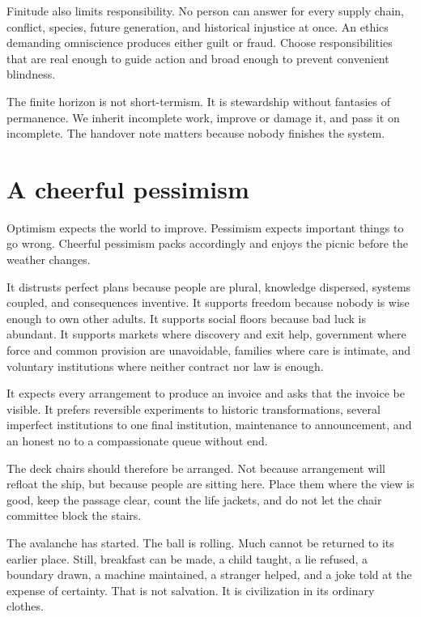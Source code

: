 \documentclass[12pt,a4paper]{book}
\begin{document}
Finitude also limits responsibility.  No person can answer for every supply
chain, conflict, species, future generation, and historical injustice at once.
An ethics demanding omniscience produces either guilt or fraud.  Choose
responsibilities that are real enough to guide action and broad enough to
prevent convenient blindness.

The finite horizon is not short-termism.  It is stewardship without fantasies
of permanence.  We inherit incomplete work, improve or damage it, and pass it
on incomplete.  The handover note matters because nobody finishes the system.

\section{A cheerful pessimism}

Optimism expects the world to improve.  Pessimism expects important things to
go wrong.  Cheerful pessimism packs accordingly and enjoys the picnic before
the weather changes.

It distrusts perfect plans because people are plural, knowledge dispersed,
systems coupled, and consequences inventive.  It supports freedom because
nobody is wise enough to own other adults.  It supports social floors because
bad luck is abundant.  It supports markets where discovery and exit help,
government where force and common provision are unavoidable, families where
care is intimate, and voluntary institutions where neither contract nor law is
enough.

It expects every arrangement to produce an invoice and asks that the invoice
be visible.  It prefers reversible experiments to historic transformations,
several imperfect institutions to one final institution, maintenance to
announcement, and an honest no to a compassionate queue without end.

The deck chairs should therefore be arranged.  Not because arrangement will
refloat the ship, but because people are sitting here.  Place them where the
view is good, keep the passage clear, count the life jackets, and do not let the
chair committee block the stairs.

The avalanche has started.  The ball is rolling.  Much cannot be returned to
its earlier place.  Still, breakfast can be made, a child taught, a lie refused,
a boundary drawn, a machine maintained, a stranger helped, and a joke told at
the expense of certainty.  That is not salvation.  It is civilization in its
ordinary clothes.
\end{document}
